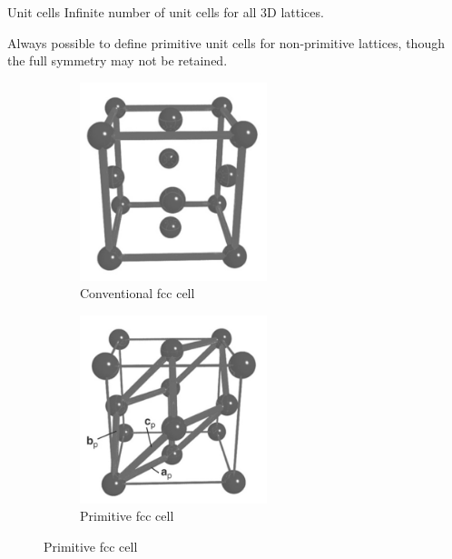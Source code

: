 \documentclass[aspectratio=169]{beamer}
\begin{document}
\begin{frame}{Unit cells}
Infinite number of unit cells for all 3D lattices. 

Always possible to define primitive unit cells for non-primitive lattices, though the full symmetry may not be retained.

\begin{figure}
    \centering
\begin{subfigure}{0.45\textwidth}
\centering
    \includegraphics[width=0.6\textwidth]{lectures/figures/7_conventional_unit_cell.png}
    \caption{Conventional fcc cell}
\end{subfigure}
\begin{subfigure}{0.45\textwidth}
        \centering
        \includegraphics[width=0.6\textwidth]{lectures/figures/7_primitive_unit_cell.png}
    \caption{Primitive fcc cell}
\end{subfigure}
\end{figure}
\end{frame} 
\end{document}
